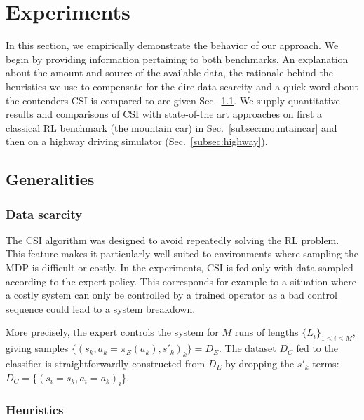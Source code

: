 \documentclass{llncs}
\begin{document}
\section{Experiments}
\label{sec:experiments}
In this section, we empirically demonstrate the behavior of our approach. We begin by providing information pertaining to both benchmarks. An explanation about the amount and source of the available data, the rationale behind the heuristics we use to compensate for the dire data scarcity and a quick word about the contenders CSI is compared to are given Sec.~\ref{subsec:generalities}. We supply quantitative results and comparisons of CSI with state-of-the art approaches on first a classical RL benchmark (the mountain car) in Sec.~\ref{subsec:mountaincar} and then on a highway driving simulator (Sec.~\ref{subsec:highway}).
\subsection{Generalities}
\label{subsec:generalities}
\subsubsection{Data scarcity}
\label{subsubsec:data}
The CSI algorithm was designed to avoid repeatedly solving the RL problem. This feature makes it particularly well-suited to environments where sampling the MDP is difficult or costly. In the experiments, CSI is fed only with data sampled according to the expert policy. This corresponds for example to a situation where a costly system can only be controlled by a trained operator as a bad control sequence could lead to a system breakdown.

More precisely, the expert controls the system for $M$ runs of lengths $\{L_i\}_{1\leq i \leq M}$, %
giving samples $\{(s_k,a_k=\pi_E(a_k),s'_k)_k\} = D_E$. The dataset $D_C$ fed to the classifier is straightforwardly constructed from $D_E$ by dropping the $s'_k$ terms:
$  D_C = \{(s_i = s_k,a_i=a_k)_i\}$.
\subsubsection{Heuristics}
\label{subsubsec:heuristics}
\end{document}
